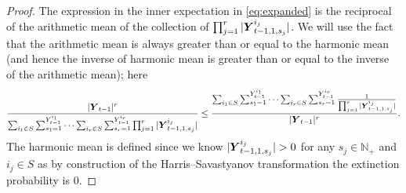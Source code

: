 \documentclass[preprint,3p,12pt]{elsarticle}
\theoremstyle{definition}
\newcommand{\Y}[1][]{%
  \ifx\relax#1\relax
    \boldsymbol{Y}_{t-1, 1, s}^{i}%
  \else
    \boldsymbol{Y}_{t-1, 1, s_{#1}}^{i_{#1}}%
  \fi
}
\begin{document}
\begin{proof}
The expression in the inner expectation in \eqref{eq:expanded} is the reciprocal of the arithmetic mean of the collection of $\prod_{j=1}^r|\Y[j]\vert$.
We will use the fact that the arithmetic mean is always greater than or equal to the harmonic mean (and hence the inverse of harmonic mean is greater than or equal to the inverse of the arithmetic mean);
here
\begin{equation}
   \frac{|\boldsymbol{Y}_{t-1}|^r}{\sum_{i_1 \in S}\sum_{s_1=1}^{Y_{t-1}^{i_1}} \dots \sum_{i_r \in S}\sum_{s_r=1}^{Y_{t-1}^{i_r}}\prod_{j=1}^r|\Y[j]|} 
   \le \frac{\sum_{i_1 \in S}\sum_{s_1=1}^{Y_{t-1}^{i_1}} \dots \sum_{i_r \in S}\sum_{s_r=1}^{Y_{t-1}^{i_r}}\frac{1}{\prod_{j=1}^r|\Y[j]|}}{|\boldsymbol{Y}_{t-1}|^r}. \label{eq:harmonic_arithmetic}
\end{equation}
The harmonic mean is defined since we know $|\Y[j]| > 0 $ for any $s_j \in \mathbb{N}_+$ and $i_j \in S$ as by construction of the Harris--Savastyanov transformation the extinction probability is 0.


\end{proof}
\end{document}
